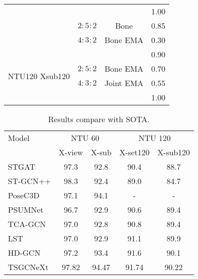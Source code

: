 \documentclass[10pt,twocolumn,letterpaper]{article}
\begin{document}
\begin{table}[htbp]
\begin{tabular}{l|cc|c}
        & \color{red}{ $2:5:2$} & \color{red}{Bone EMA}  & 1.00  \\
        &$2:5:2$   & Bone & 0.85  \\
        &$4:3:2$   & Bone EMA & 0.30  \\
    \midrule
    \multirow{4}[2]{*}{NTU120 Xsub120}&\color{red}{$2:5:2$} & \color{red}{Joint EMA} & 0.90  \\
        & $2:5:2$ & Bone EMA  & 0.70  \\
        &$4:3:2$   & Joint EMA & 0.55  \\
        &\color{red}{$4:3:2$   }& \color{red}{Bone EMA} & 1.00  \\
    \bottomrule
    \end{tabular}\label{tab:ws}\end{table}


 \begin{table}
\centering
  \caption{Results compare with SOTA.}
  \label{tab:result}
    \begin{tabular}{l|cc|cc}
    \toprule
    Model & \multicolumn{2}{c}{NTU 60} & \multicolumn{2}{c}{NTU 120} \\
         & X-view &X-sub & X-set120 & X-sub120 \\
    \midrule	
    STGAT &97.3& 92.8& 90.4 & 88.7\\
    ST-GCN++ &98.3&92.4&89.0&84.7\\
    PoseC3D&97.1&94.1&-&-\\
    PSUMNet &96.7 &92.9& 90.6 & 89.4\\
    TCA-GCN &97.0 &92.8 & 90.8 & 89.4\\
    LST &97.0 &92.9 & 91.1 & 89.9\\
    HD-GCN &97.2 &93.4 & 91.6 & 90.1\\
    \midrule
    TSGCNeXt& 97.82 & \color{red}94.47 & \color{red}91.74 & \color{red}90.22 \\
    \bottomrule
    \end{tabular}\label{tab:newcompare}\end{table} 
\end{document}

